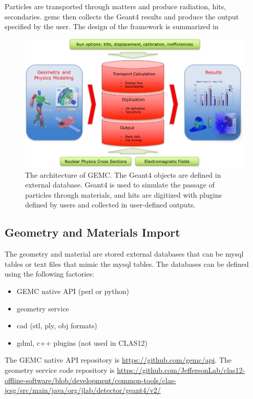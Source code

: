 Particles are transported through matters and produce radiation, hits, secondaries.
gemc then collects the Geant4 results and produce the output specified by the user.
The design of the framework is summarized in 

\begin{figure}
	\centering
	\includegraphics[width=0.98\columnwidth,keepaspectratio]{img/gemcDesign.png}
	\caption{The architecture of GEMC. The Geant4 objects are defined in external database. Geant4 is used to simulate the
             passage of particles through materials, and hits are digitized with plugins defined by users
             and collected in user-defined outputs. }
	\label{fig:gemcDesign}
\end{figure}


\subsection{Geometry and Materials Import}

The geometry and material are stored external databases that can be mysql tables or text files that mimic the mysql tables.
The databases can be defined using the following factories:

\begin{itemize}
	\item GEMC native API (perl or python)
	\item geometry service
	\item cad (stl, ply, obj formats)
	\item gdml, c++ plugins (not used in CLAS12)
\end{itemize}

The GEMC native API repository is \url{https://github.com/gemc/api}. The geometry service code repository is
\url{https://github.com/JeffersonLab/clas12-offline-software/blob/development/common-tools/clas-jcsg/src/main/java/org/jlab/detector/geant4/v2/}


